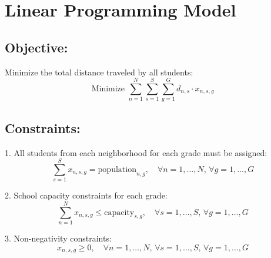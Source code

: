 \documentclass{article}
\begin{document}
\section*{Linear Programming Model}

\subsection*{Objective:}
Minimize the total distance traveled by all students:
\[
\text{Minimize } \sum_{n=1}^{N} \sum_{s=1}^{S} \sum_{g=1}^{G} d_{n,s} \cdot x_{n,s,g}
\]

\subsection*{Constraints:}

1. All students from each neighborhood for each grade must be assigned:
\[
\sum_{s=1}^{S} x_{n,s,g} = \text{population}_{n,g}, \quad \forall n = 1, \ldots, N, \, \forall g = 1, \ldots, G
\]

2. School capacity constraints for each grade:
\[
\sum_{n=1}^{N} x_{n,s,g} \leq \text{capacity}_{s,g}, \quad \forall s = 1, \ldots, S, \, \forall g = 1, \ldots, G
\]

3. Non-negativity constraints:
\[
x_{n,s,g} \geq 0, \quad \forall n = 1, \ldots, N, \, \forall s = 1, \ldots, S, \, \forall g = 1, \ldots, G
\]
\end{document}
